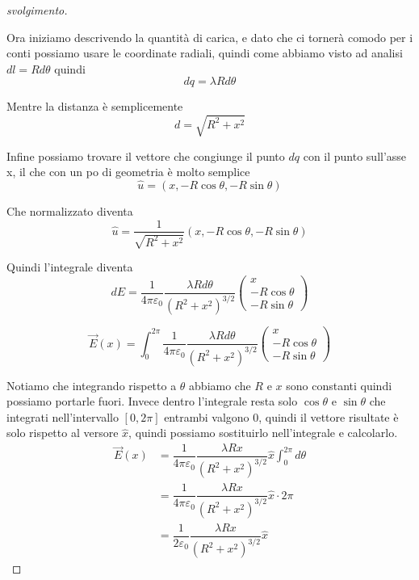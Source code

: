 \documentclass{rapport}
\begin{document}
\begin{proof}[svolgimento]
\begin{center}
\begin{tikzpicture}
\end{tikzpicture}
  \end{center}


Ora iniziamo descrivendo la quantità di carica, e dato che ci tornerà comodo per i conti possiamo usare le coordinate radiali, quindi come abbiamo visto ad analisi $dl = Rd\theta$ quindi 
\[
dq = \lambda Rd\theta
\]

Mentre la distanza è semplicemente 
\[
d = \sqrt{R^2+x^2}
\]

Infine possiamo trovare il vettore che congiunge il punto $dq$ con il punto sull'asse x, il che con un po di geometria è molto semplice 
\[
\hat{u} = (x, -R\cos\theta, -R\sin\theta )
\]

Che normalizzato diventa 
\[
\hat{u} = \dfrac{1}{\sqrt{R^2+x^2}}(x, -R\cos\theta, -R\sin\theta )
\]


Quindi l'integrale diventa 
\[
dE = \dfrac{1}{4\pi \varepsilon_0} \dfrac{\lambda Rd\theta}{(R^2+x^2)^{3/2}} \begin{pmatrix}
  x \\
   -R\cos\theta \\
   -R\sin\theta 
\end{pmatrix}
\]

\[
\vec{E}(x) = \int_{0}^{2\pi}\dfrac{1}{4\pi \varepsilon_0} \dfrac{\lambda Rd\theta}{(R^2+x^2)^{3/2}} \begin{pmatrix}
  x \\
   -R\cos\theta \\
   -R\sin\theta 
\end{pmatrix}
\]

Notiamo che integrando rispetto a $\theta$ abbiamo che $R$ e $x$ sono constanti quindi possiamo portarle fuori. Invece dentro l'integrale resta solo $\cos\theta$ e $\sin\theta$ che integrati nell'intervallo $[0, 2\pi]$ entrambi valgono 0, quindi il vettore risultate è solo rispetto al versore $\hat{x}$, quindi possiamo sostituirlo nell'integrale e calcolarlo.
\begin{align*}
  \vec{E}(x) &= \dfrac{1}{4\pi \varepsilon_0} \dfrac{\lambda Rx}{(R^2+x^2)^{3/2}} \hat{x} \int_{0}^{2\pi}d\theta \\
  &= \dfrac{1}{4\pi \varepsilon_0} \dfrac{\lambda Rx}{(R^2+x^2)^{3/2}} \hat{x} \cdot 2\pi \\
  &= \dfrac{1}{2\varepsilon_0} \dfrac{\lambda Rx}{(R^2+x^2)^{3/2}} \hat{x} 
\end{align*}

\end{proof}
\end{document}
